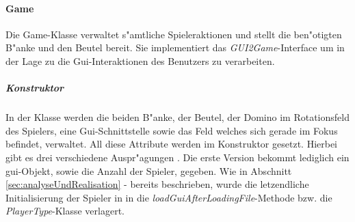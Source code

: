 \paragraph{Game}
\label{par:game}
Die Game-Klasse verwaltet s"amtliche Spieleraktionen und stellt die ben"otigten B"anke und den Beutel bereit. Sie implementiert das \emph{GUI2Game}-Interface um in der Lage zu die Gui-Interaktionen des Benutzers zu verarbeiten. 

\subparagraph{Konstruktor}
In der Klasse werden die beiden B"anke, der Beutel, der Domino im Rotationsfeld des Spielers, eine Gui-Schnittstelle sowie das Feld welches sich gerade im Fokus befindet, verwaltet. All diese Attribute werden im Konstruktor gesetzt. Hierbei gibt es drei verschiedene Auspr"agungen . Die erste Version bekommt lediglich ein gui-Objekt, sowie die Anzahl der Spieler, gegeben. Wie in Abschnitt \ref{sec:analyseUndRealisation} -  bereits beschrieben, wurde die letzendliche Initialisierung der Spieler in in die \emph{loadGuiAfterLoadingFile}-Methode bzw. die \emph{PlayerType}-Klasse verlagert. 


